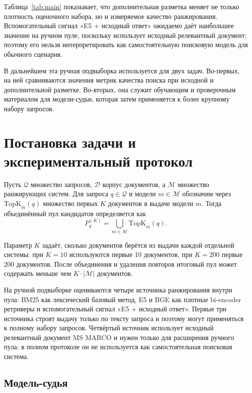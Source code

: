 \documentclass[runningheads,a4paper]{llncs}
\begin{document}
Таблица~\ref{tab:main} показывает, что дополнительная разметка меняет не только плотность оценочного набора, но и измеряемое качество ранжирования. Вспомогательный сигнал «E5 + исходный ответ» ожидаемо даёт наибольшее значение на ручном пуле, поскольку использует исходный релевантный документ; поэтому его нельзя интерпретировать как самостоятельную поисковую модель для обычного сценария.

В дальнейшем эта ручная подвыборка используется для двух задач. Во-первых, на ней сравниваются значения метрик качества поиска при исходной и дополнительной разметке. Во-вторых, она служит обучающим и проверочным материалом для модели-судьи, которая затем применяется к более крупному набору запросов.

\section{Постановка задачи и экспериментальный протокол}

Пусть $\mathcal{Q}$ \textemdash{} множество запросов, $\mathcal{D}$ \textemdash{} корпус документов, а $\mathcal{M}$ \textemdash{} множество ранжирующих систем. Для запроса $q \in \mathcal{Q}$ и модели $m \in \mathcal{M}$ обозначим через $\mathrm{TopK}_m(q)$ множество первых $K$ документов в выдаче модели $m$. Тогда объединённый пул кандидатов определяется как
\begin{equation}
\label{eq:pool}
P_q^{(K)} = \bigcup_{m \in \mathcal{M}} \mathrm{TopK}_m(q).
\end{equation}

Параметр $K$ задаёт, сколько документов берётся из выдачи каждой отдельной системы: при $K=10$ используются первые 10 документов, при $K=200$ \textemdash{} первые 200 документов. После объединения и удаления повторов итоговый пул может содержать меньше чем $K \cdot |\mathcal{M}|$ документов.

На ручной подвыборке оцениваются четыре источника ранжирования внутри пула: BM25 как лексический базовый метод, E5 и BGE как плотные bi-encoder ретриверы и вспомогательный сигнал «E5 + исходный ответ». Первые три источника строят выдачу только по тексту запроса и поэтому могут применяться к полному набору запросов. Четвёртый источник использует исходный релевантный документ MS MARCO и нужен только для расширения ручного пула; в полном протоколе он не используется как самостоятельная поисковая система.

\subsection{Модель-судья}
\end{document}
